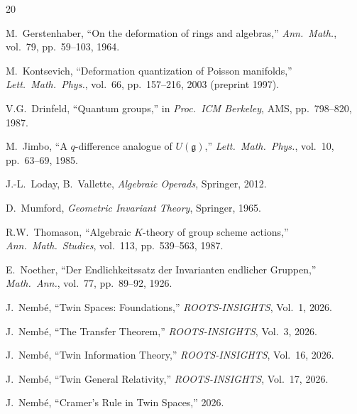\documentclass[11pt,twocolumn]{article}
\theoremstyle{plain}\newtheorem{theorem}{Theorem}\newtheorem{proposition}[theorem]{Proposition}\newtheorem{corollary}[theorem]{Corollary}\newtheorem{lemma}[theorem]{Lemma}
\theoremstyle{definition}\newtheorem{definition}[theorem]{Definition}\newtheorem{example}[theorem]{Example}
\theoremstyle{remark}\newtheorem{remark}[theorem]{Remark}
\begin{document}
\begin{thebibliography}{20}

 M.~Gerstenhaber, ``On the deformation of rings and algebras,'' \emph{Ann.\ Math.}, vol.~79, pp.~59--103, 1964.

 M.~Kontsevich, ``Deformation quantization of Poisson manifolds,'' \emph{Lett.\ Math.\ Phys.}, vol.~66, pp.~157--216, 2003 (preprint 1997).

 V.G.~Drinfeld, ``Quantum groups,'' in \emph{Proc.\ ICM Berkeley}, AMS, pp.~798--820, 1987.

 M.~Jimbo, ``A $q$-difference analogue of $U(\mathfrak{g})$,'' \emph{Lett.\ Math.\ Phys.}, vol.~10, pp.~63--69, 1985.

 J.-L.~Loday, B.~Vallette, \emph{Algebraic Operads}, Springer, 2012.

 D.~Mumford, \emph{Geometric Invariant Theory}, Springer, 1965.

 R.W.~Thomason, ``Algebraic $K$-theory of group scheme actions,'' \emph{Ann.\ Math.\ Studies}, vol.~113, pp.~539--563, 1987.

 E.~Noether, ``Der Endlichkeitssatz der Invarianten endlicher Gruppen,'' \emph{Math.\ Ann.}, vol.~77, pp.~89--92, 1926.

 J.~Nemb\'e, ``Twin Spaces: Foundations,'' \emph{ROOTS-INSIGHTS}, Vol.~1, 2026.

 J.~Nemb\'e, ``The Transfer Theorem,'' \emph{ROOTS-INSIGHTS}, Vol.~3, 2026.

 J.~Nemb\'e, ``Twin Information Theory,'' \emph{ROOTS-INSIGHTS}, Vol.~16, 2026.

 J.~Nemb\'e, ``Twin General Relativity,'' \emph{ROOTS-INSIGHTS}, Vol.~17, 2026.

 J.~Nemb\'e, ``Cramer's Rule in Twin Spaces,'' 2026.

\end{thebibliography}
\end{document}
